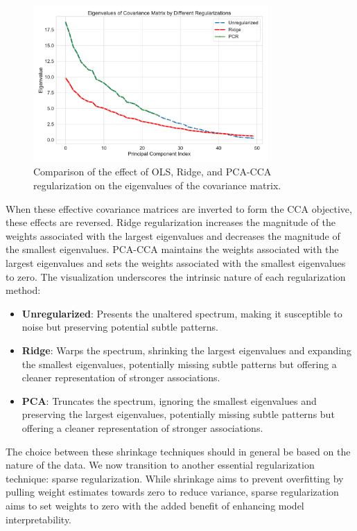 \begin{figure}
    \centering
    \includegraphics[width=0.8\textwidth]{figures/shrinkage/shrinkage}
    \caption{Comparison of the effect of OLS, Ridge, and PCA-CCA regularization on the eigenvalues of the covariance matrix.}\label{fig:shrinkage}
\end{figure}

When these effective covariance matrices are inverted to form the CCA objective, these effects are reversed.
Ridge regularization increases the magnitude of the weights associated with the largest eigenvalues and decreases the magnitude of the smallest eigenvalues.
PCA-CCA maintains the weights associated with the largest eigenvalues and sets the weights associated with the smallest eigenvalues to zero.
The visualization underscores the intrinsic nature of each regularization method:
\begin{itemize}
    \item \textbf{Unregularized}: Presents the unaltered spectrum, making it susceptible to noise but preserving potential subtle patterns.
    \item \textbf{Ridge}: Warps the spectrum, shrinking the largest eigenvalues and expanding the smallest eigenvalues, potentially missing subtle patterns but offering a cleaner representation of stronger associations.
    \item \textbf{PCA}: Truncates the spectrum, ignoring the smallest eigenvalues and preserving the largest eigenvalues, potentially missing subtle patterns but offering a cleaner representation of stronger associations.
\end{itemize}
The choice between these shrinkage techniques should in general be based on the nature of the data.
We now transition to another essential regularization technique: sparse regularization.
While shrinkage aims to prevent overfitting by pulling weight estimates towards zero to reduce variance, sparse regularization aims to set \gls{weights} to zero with the added benefit of enhancing model interpretability.

